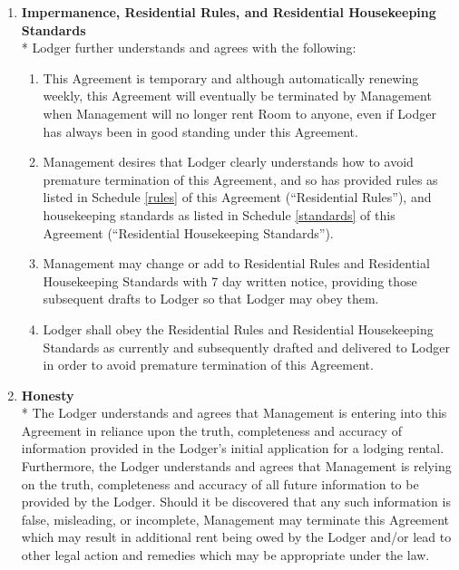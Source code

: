 \documentclass[12pt,letterpaper]{article}
\newcommand{\rules}{Residential Rules}
\newcommand{\standards}{Residential Housekeeping Standards}
\newcommand{\management}{Management}
\newcommand{\room}{Room}
\begin{document}
\begin{enumerate}
		\item \textbf{Impermanence, \rules{}, and \standards{}}\\*
			Lodger further understands and agrees with the following: 
			\begin{enumerate}
				\item This Agreement is temporary and although automatically renewing weekly, this Agreement will eventually be terminated by \management{} when \management{} will no longer rent \room{} to anyone, even if Lodger has always been in good standing under this Agreement. 
				\item \management{} desires that Lodger clearly understands how to avoid premature termination of this Agreement, and so has provided rules as listed in Schedule \ref{rules} of this Agreement (``\rules{}''), and housekeeping standards as listed in Schedule \ref{standards} of this Agreement (``\standards{}''). 
				\item \management{} may change or add to \rules{} and \standards{} with 7 day written notice, providing those subsequent drafts to Lodger so that Lodger may obey them. 
				\item Lodger shall obey the \rules{} and \standards{} as currently and subsequently drafted and delivered to Lodger in order to avoid premature termination of this Agreement.
			\end{enumerate}

		\item \textbf{Honesty}\\*
			The Lodger understands and agrees that \management{} is entering into this Agreement in reliance upon the truth, completeness and accuracy of information provided in the Lodger's initial application for a lodging rental. Furthermore, the Lodger understands and agrees that \management{} is relying on the truth, completeness and accuracy of all future information to be provided by the Lodger. Should it be discovered that any such information is false, misleading, or incomplete, \management{} may terminate this Agreement which may result in additional rent being owed by the Lodger and/or lead to other legal action and remedies which may be appropriate under the law. 

	\end{enumerate}
\end{document}
